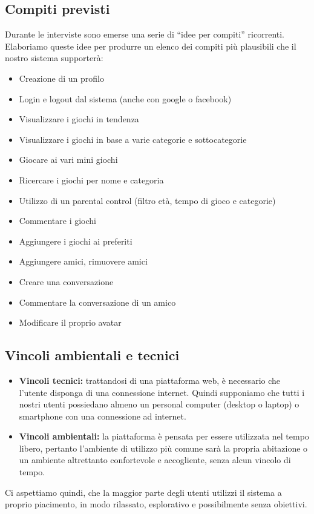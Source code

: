 \documentclass[../Report.tex]{subfiles}
\begin{document}
        \subsection{Compiti previsti}
        Durante le interviste sono emerse una serie di “idee per compiti” ricorrenti. Elaboriamo queste idee per produrre un elenco dei compiti più plausibili che il nostro sistema supporterà:
        \begin{itemize}
            \item Creazione di un profilo
            \item Login e logout dal sistema (anche con google o facebook)
            \item Visualizzare i giochi in tendenza
            \item Visualizzare i giochi in base a varie categorie e sottocategorie
            \item Giocare ai vari mini giochi
            \item Ricercare i giochi per nome e categoria
            \item Utilizzo di un parental control (filtro età, tempo di gioco e categorie)
            \item Commentare i giochi
            \item Aggiungere i giochi ai preferiti
            \item Aggiungere amici, rimuovere amici 
            \item Creare una conversazione
            \item Commentare la conversazione di un amico
            \item Modificare il proprio avatar 
        \end{itemize}

        \subsection{Vincoli ambientali e tecnici}
        \begin{itemize}
            \item \textbf{Vincoli tecnici:} trattandosi di una piattaforma web, è necessario che l'utente disponga di una connessione internet. Quindi supponiamo che tutti i nostri utenti possiedano almeno un personal computer (desktop o laptop) o smartphone con una connessione ad internet.
            \item \textbf{Vincoli ambientali:} la piattaforma è pensata per essere utilizzata nel tempo libero, pertanto l'ambiente di utilizzo più comune sarà la propria abitazione o un ambiente altrettanto confortevole e accogliente, senza alcun vincolo di tempo.
        \end{itemize}
        Ci aspettiamo quindi, che la maggior parte degli utenti utilizzi il sistema a proprio piacimento, in modo rilassato, esplorativo e possibilmente senza obiettivi.
\end{document}
